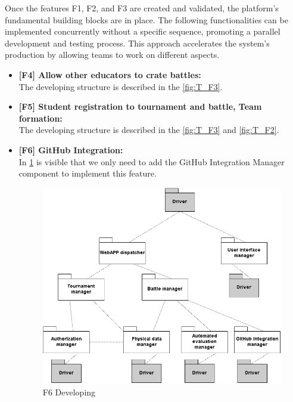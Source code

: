 Once the features F1, F2, and F3 are created and validated, the platform's fundamental building blocks are in place. The following functionalities can be implemented concurrently without a specific sequence, promoting a parallel development and testing process. This approach accelerates the system's production by allowing teams to work on different aspects.

\begin{itemize}

    \item \textbf{[F4] Allow other educators to crate battles:} \\
        The developing structure is described in the \ref{fig:T_F3}.
    \item \textbf{[F5] Student registration to tournament and battle, Team formation:} \\
        The developing structure is described in the \ref{fig:T_F3} and \ref{fig:T_F2}.
        
    \item \textbf{[F6] GitHub Integration:} \\
        In \ref{fig:T_F6} is visible that we only need to add the GitHub Integration Manager component to implement this feature.
        \begin{figure}[h!]
            \centering
            \includegraphics[width=\linewidth]{Images/T_F6.png}
            \caption{F6 Developing}
            \label{fig:T_F6}
        \end{figure}
    

\end{itemize}
